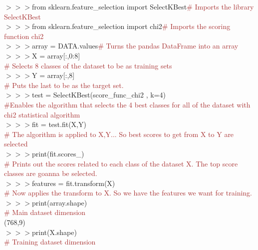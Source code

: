 \documentclass[a4paper,18pt]{article}
\begin{document}
$>>>$from sklearn.feature\_selection import SelectKBest{\textcolor{brown}{\# Imports the library SelectKBest}}\\

$>>>$from sklearn.feature\_selection import chi2{\textcolor{brown}{\# Imports the scoring function chi2}}\\

$>>>$array = DATA.values{\textcolor{brown}{\# Turns the pandas DataFrame into an array}}\\

$>>>$X = array[:,0:8]\\{\textcolor{brown}{\# Selects 8 classes of the dataset to be as training sets}}\\

$>>>$Y = array[:,8]\\{\textcolor{brown}{\# Puts the last to be as the target set.}}\\

$>>>$test = SelectKBest(score\_func\_chi2 , k=4)\\{\textcolor{brown}{\#Enables the algorithm that selects the 4 best classes for all of the dataset with chi2 statistical algorithm}}\\

$>>>$fit = test.fit(X,Y)\\{\textcolor{brown}{\# The algorithm is applied to X,Y... So best scores to get from X to Y are selected}}\\

$>>>$print(fit.scores\_)\\{\textcolor{brown}{\# Prints out the scores related to each class of the dataset X. The top score classes are goanna be selected.}}\\

$>>>$features = fit.transform(X)\\{\textcolor{brown}{\# Now applies the transform to X. So we have the features we want for training.}}\\

$>>>$print(array.shape)\\{\textcolor{brown}{\# Main dataset dimension}}\\

\hspace{14pt} (768,9)\\

$>>>$print(X.shape)\\{\textcolor{brown}{\# Training dataset dimension}}\\
\end{document}
